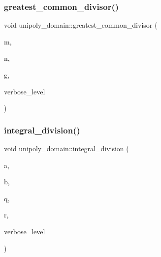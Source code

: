 \subsubsection{\texorpdfstring{greatest\+\_\+common\+\_\+divisor()}{greatest\_common\_divisor()}}
{\footnotesize\ttfamily void unipoly\+\_\+domain\+::greatest\+\_\+common\+\_\+divisor (\begin{DoxyParamCaption}\item[{\mbox{\hyperlink{galois_8h_a77ca58de3d2da6172242493dd9c8aaa8}{unipoly\+\_\+object}}}]{m,  }\item[{\mbox{\hyperlink{galois_8h_a77ca58de3d2da6172242493dd9c8aaa8}{unipoly\+\_\+object}}}]{n,  }\item[{\mbox{\hyperlink{galois_8h_a77ca58de3d2da6172242493dd9c8aaa8}{unipoly\+\_\+object}} \&}]{g,  }\item[{\mbox{\hyperlink{galois_8h_a09fddde158a3a20bd2dcadb609de11dc}{I\+NT}}}]{verbose\+\_\+level }\end{DoxyParamCaption})}

\mbox{\label{classunipoly__domain_a22f73567ccec05778c3a67fd85c5e413}} 
\subsubsection{\texorpdfstring{integral\+\_\+division()}{integral\_division()}}
{\footnotesize\ttfamily void unipoly\+\_\+domain\+::integral\+\_\+division (\begin{DoxyParamCaption}\item[{\mbox{\hyperlink{galois_8h_a77ca58de3d2da6172242493dd9c8aaa8}{unipoly\+\_\+object}}}]{a,  }\item[{\mbox{\hyperlink{galois_8h_a77ca58de3d2da6172242493dd9c8aaa8}{unipoly\+\_\+object}}}]{b,  }\item[{\mbox{\hyperlink{galois_8h_a77ca58de3d2da6172242493dd9c8aaa8}{unipoly\+\_\+object}} \&}]{q,  }\item[{\mbox{\hyperlink{galois_8h_a77ca58de3d2da6172242493dd9c8aaa8}{unipoly\+\_\+object}} \&}]{r,  }\item[{\mbox{\hyperlink{galois_8h_a09fddde158a3a20bd2dcadb609de11dc}{I\+NT}}}]{verbose\+\_\+level }\end{DoxyParamCaption})}

\mbox{\label{classunipoly__domain_ae08b2f84ea25a3b0f310edec6ad9cf66}} 
